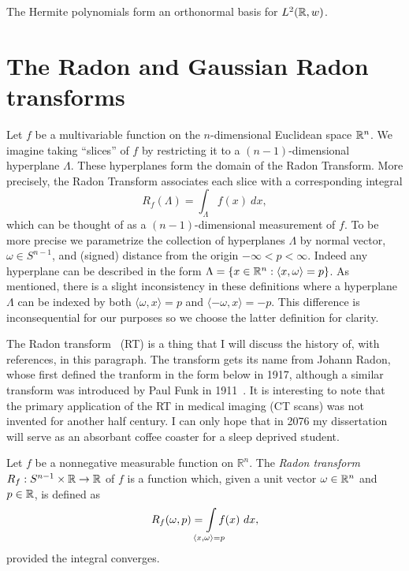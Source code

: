 The Hermite polynomials form an orthonormal basis for $L^2(\mathbb{R}, w)$.

\section{The Radon and Gaussian Radon transforms}

Let $f$ be a multivariable function on the $n$-dimensional Euclidean space $\mathbb{R}^n$. We imagine taking ``slices'' of $f$ by restricting it to a $(n-1)$-dimensional hyperplane $\Lambda$. These hyperplanes form the domain of the Radon Transform. More precisely, the Radon Transform associates each slice with a corresponding integral
\[
  R_f(\Lambda) = \int_{\Lambda} f(x) ~dx,
\]
which can be thought of as a $(n-1)$-dimensional measurement of $f$. To be more precise we parametrize the collection of hyperplanes $\Lambda$ by normal vector, $\omega \in S^{n-1}$, and (signed) distance from the origin $-\infty < p < \infty$. Indeed any hyperplane can be described in the form $\Lambda = \{x \in \mathbb{R}^n: \langle x, \omega\rangle = p\}$. As mentioned, there is a slight inconsistency in these definitions where a hyperplane $\Lambda$ can be indexed by both $\langle \omega, x \rangle = p$ and $\langle -\omega, x \rangle = -p$. This difference is inconsequential for our purposes so we choose the latter definition for clarity.

The Radon transform~\cite{Helg65} (RT) is a thing that I will discuss the history of, with references, in this paragraph. The transform gets its name from Johann Radon, whose first defined the tranform in the form below in 1917, although a similar transform was introduced by Paul Funk in 1911~\cite{????}. It is interesting to note that the primary application of the RT in medical imaging (CT scans) was not invented for another half century. I can only hope that in 2076 my dissertation will serve as an absorbant coffee coaster for a sleep deprived student.

\begin{definition}
  Let $f$ be a nonnegative measurable function on $\mathbb{R}^n$. The \emph{Radon transform} $R_f : S^{n-1} \times \mathbb{R} \rightarrow \mathbb{R}$ of $f$ is a function which, given a unit vector $\omega \in \mathbb{R}^n$ and $p \in \mathbb{R}$, is defined as
  \[
    R_f(\omega, p) = \int\mclimits_{\langle x, \omega \rangle = p} f(x) ~dx,
  \]
  provided the integral converges.
\end{definition}

